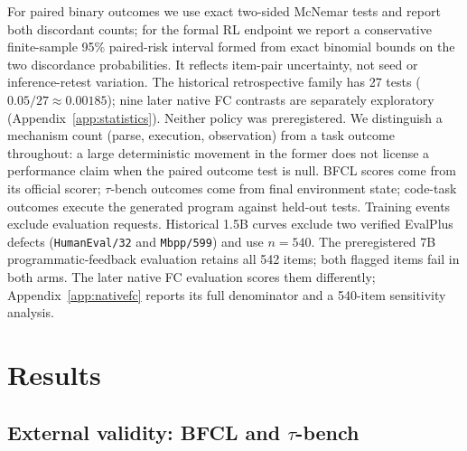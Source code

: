 For paired binary outcomes we use exact two-sided McNemar tests and report both discordant counts;
for the formal RL endpoint we report a conservative finite-sample 95\% paired-risk interval
formed from exact binomial bounds on the two discordance probabilities. It reflects item-pair
uncertainty, not seed or inference-retest variation. The historical retrospective family has 27 tests
($0.05/27\approx0.00185$); nine later native FC contrasts are separately exploratory
(Appendix~\ref{app:statistics}). Neither policy was preregistered. We
distinguish a mechanism count (parse, execution, observation) from a task outcome throughout: a
large deterministic movement in the former does not license a performance claim when the paired
outcome test is null. BFCL scores come from its official scorer; $\tau$-bench outcomes come from
final environment state; code-task outcomes execute the generated program against held-out tests.
Training events exclude evaluation requests. Historical 1.5B curves exclude two verified
EvalPlus defects (\texttt{HumanEval/32} and \texttt{Mbpp/599}) and use $n=540$. The preregistered
7B programmatic-feedback evaluation retains all 542 items; both flagged items fail in both arms.
The later native FC evaluation scores them differently; Appendix~\ref{app:nativefc}
reports its full denominator and a 540-item sensitivity analysis.

\section{Results}
\label{sec:results}

\subsection{External validity: BFCL and $\tau$-bench}
\label{sec:bfcl}
\label{sec:tau}

